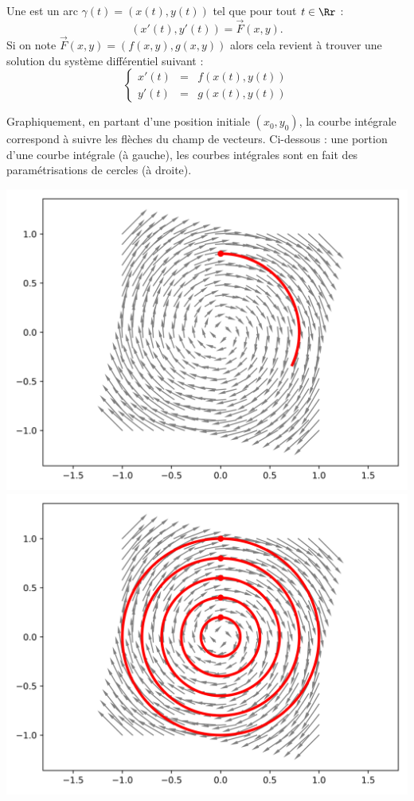 \documentclass[11pt,class=report,crop=false]{standalone}
\begin{document}
Une  est un arc $\gamma(t) = (x(t), y(t) )$ tel que pour tout $t \in \Rr$ :
$$(x'(t), y'(t)) = \vec F(x,y).$$
Si on note $\vec F (x,y) = (f(x,y), g(x,y))$ alors cela revient à trouver une solution du système différentiel suivant :
$$\left\lbrace
\begin{array}{rcl}
  x'(t) &=& f(x(t),y(t)) \\
  y'(t) &=& g(x(t),y(t))
\end{array}
\right.$$


Graphiquement, en partant d'une position initiale $(x_0,y_0)$, la courbe intégrale correspond à suivre les flèches du champ de vecteurs.
Ci-dessous : une portion d'une courbe intégrale (à gauche), les courbes intégrales sont en fait des paramétrisations de cercles (à droite).
\begin{center}
  \includegraphics[scale=\myscale, scale=0.5]{figures/equadiff-sys-02}\qquad
  \includegraphics[scale=\myscale, scale=0.5]{figures/equadiff-sys-03} 
\end{center}
\end{document}
